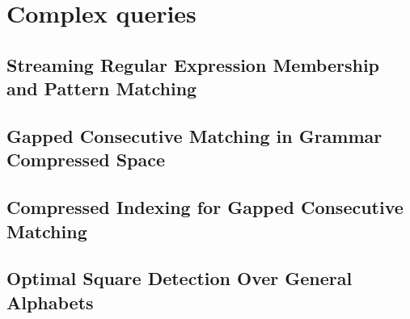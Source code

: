 \part{Complex queries}

\mainmatter
\chapter{Streaming Regular Expression Membership and Pattern Matching}\label{chap:regexp}
%

\mainmatter
\chapter{Gapped Consecutive Matching in Grammar Compressed Space}\label{chap:gapped_pm}
\mainmatter
\chapter{Compressed Indexing for Gapped Consecutive Matching}\label{chap:gapped_index}

\mainmatter
\chapter{Optimal Square Detection Over General Alphabets}\label{chap:squares}
%